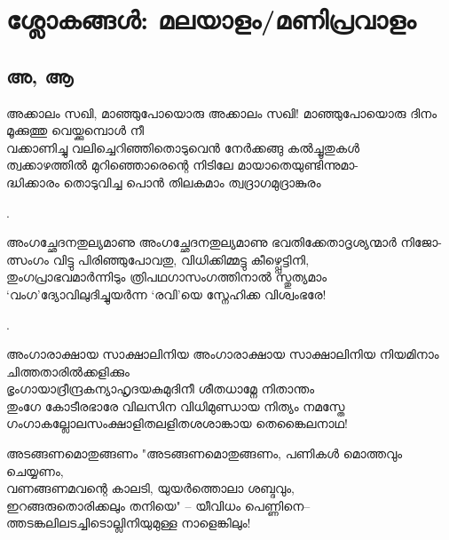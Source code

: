 
\clearpage

\section{ശ്ലോകങ്ങൾ: മലയാളം/മണിപ്രവാളം}
\label{sec:slokams:mal}

\subsection{അ, ആ}

\begin{enumerate}

\begin{slokam}{\VSv}{\PG}{അക്കാലം സഖി, മാഞ്ഞുപോയൊരു} %
അക്കാലം സഖി! മാഞ്ഞുപോയൊരു ദിനം മൂക്കുത്തു വെയ്ക്കുമ്പൊള്‍ നീ\\
വക്കാണിച്ചു വലിച്ചെറിഞ്ഞിതൊടുവെൻ നേർക്കങ്ങു കൽച്ചൂതുകള്‍\\
ത്വക്കാഴത്തിൽ മുറിഞ്ഞൊരെന്റെ നിടിലേ മായാതെയുണ്ടിന്നുമാ-\\
ദ്ധിക്കാരം തൊടുവിച്ച പൊൻ തിലകമാം ത്വദ്രാഗമുദ്രാങ്കുരം
\end{slokam} %


. %


\begin{slokam}{\VSv}{\KA}{അംഗച്ഛേദനതുല്യമാണു}
അംഗച്ഛേദനതുല്യമാണു ഭവതിക്കേതാദൃശ്യന്മാർ നിജോ-\\
ത്സംഗം വിട്ടു പിരിഞ്ഞുപോവതു, വിധിക്കിമ്മട്ടു കീഴ്പ്പെട്ടിനി,\\
തുംഗപ്രാഭവമാർന്നിടും ത്രിപഥഗാസംഗത്തിനാൽ സ്തുത്യമാം\\
‘വംഗ’ദ്യോവിലുദിച്ചുയർന്ന ‘രവി’യെ സ്നേഹിക്ക വിശ്വംഭരേ!
\end{slokam}


.



\begin{slokam}{\VSr}{\Unk}{അംഗാരാക്ഷായ സാക്ഷാലിനിയ}
അംഗാരാക്ഷായ സാക്ഷാലിനിയ നിയമിനാം ചിത്തതാരിൽക്കളിക്കും\\
ഭൃംഗായാദ്രീന്ദ്രകന്യാഹൃദയകുമുദിനീ ശീതധാമ്നേ നിതാന്തം\\
തുംഗേ കോടീരഭാരേ വിലസിന വിധിമുണ്ഡായ നിത്യം നമസ്തേ\\
ഗംഗാകല്ലോലസംക്ഷാളിതലളിതശശാങ്കായ തെങ്കൈലനാഥ!
\end{slokam}



\begin{slokam}{\VPv}{\UN}{അടങ്ങണമൊതുങ്ങണം}
"അടങ്ങണമൊതുങ്ങണം, പണികൾ മൊത്തവും ചെയ്യണം,\\
വണങ്ങണമവന്റെ കാലടി, യുയർത്തൊലാ ശബ്ദവും,\\
ഇറങ്ങരുതൊരിക്കലും തനിയെ" -- യീവിധം പെണ്ണിനെ--\\
ത്തടങ്കലിലടച്ചിടൊല്ലിനിയുമുള്ള നാളെങ്കിലും!
\end{slokam}


\end{enumerate}
